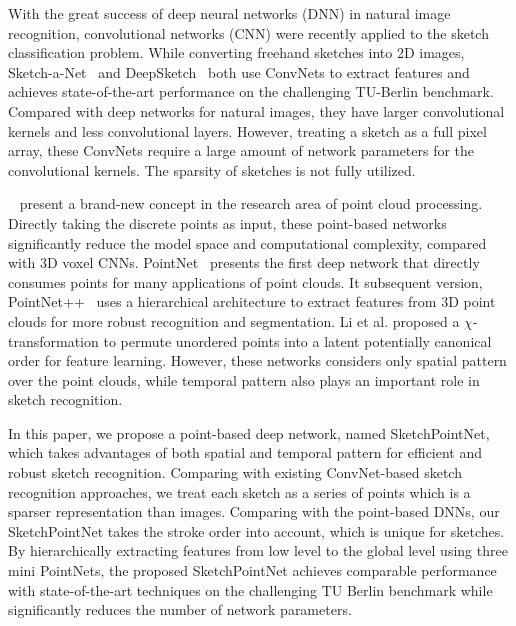


With the great success of deep neural networks (DNN) in natural image recognition, convolutional networks (CNN) were recently applied to the sketch classification problem.
%
While converting freehand sketches into 2D images, Sketch-a-Net~\cite{Yu2015SketchaNetTB} and DeepSketch~\cite{Seddati2015DeepSketchDC} both use ConvNets to extract features and achieves state-of-the-art performance on the challenging TU-Berlin benchmark.
%
Compared with deep networks for natural images, they have larger convolutional kernels and less convolutional layers.
However, treating a sketch as a full pixel array, these ConvNets require a large amount of network parameters for the convolutional kernels.
The sparsity of sketches is not fully utilized.

~\cite{qi2017pointnet, qi2017pointnetplusplus, 1801.07791} present a brand-new concept in the research area of point cloud processing.
Directly taking the discrete points as input, these point-based networks significantly reduce the model space and computational complexity, compared with 3D voxel CNNs.
%
PointNet~\cite{qi2017pointnet} presents the first deep network that directly consumes points for many applications of point clouds.
It subsequent version, PointNet++~\cite{qi2017pointnetplusplus} uses a hierarchical architecture to extract features from 3D point clouds for more robust recognition and segmentation.
%
Li et al. \cite{1801.07791} proposed a $\chi$-transformation to permute unordered points into a latent potentially canonical order for feature learning.
However, these networks considers only spatial pattern over the point clouds, while temporal pattern also plays an important role in sketch recognition.



In this paper, we propose a point-based deep network, named SketchPointNet, which takes advantages of both spatial and temporal pattern for efficient and robust sketch recognition.
%
Comparing with existing ConvNet-based sketch recognition approaches, we treat each sketch as a series of points which is a sparser representation than images.
Comparing with the point-based DNNs, our SketchPointNet takes the stroke order into account,  which is unique for sketches.
%
By hierarchically extracting features from low level to the global level using three mini PointNets, the proposed SketchPointNet achieves comparable performance with state-of-the-art techniques on the challenging TU Berlin benchmark while significantly reduces the number of network parameters.



